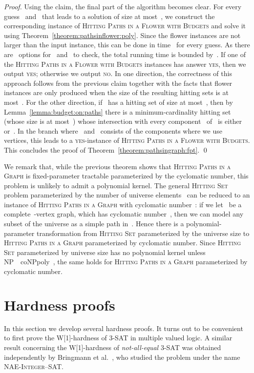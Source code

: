 \let\accentvec\vec  \documentclass{llncs}
\newcommand{\yes}{\textsc{yes}\xspace}
\newcommand{\no}{\textsc{no}\xspace}
\newcommand{\containment}[0]{{\sf NP}~~{\sf coNPpoly}\xspace}
\newcommand{\HitPathsInFlower}{\textsc{Hitting Paths in a Flower with Budgets}\xspace}
\newcommand{\HitPathsInGraph}{\textsc{Hitting Paths in a Graph}\xspace}
\newcommand{\HittingSet}{\textsc{Hitting Set}\xspace}
\begin{document}
\begin{proof}
Using the claim, the final part of the algorithm becomes clear. For every guess~ and~ that leads to a solution of size at most~, we construct the corresponding instance of \HitPathsInFlower and solve it using Theorem~\ref{theorem:pathsinflower:poly}. Since the flower instances are not larger than the input instance, this can be done in time~ for every guess. As there are~ options for~ and~ to check, the total running time is bounded by~. If one of the \HitPathsInFlower instances has answer \yes, then we output \yes; otherwise we output \no. In one direction, the correctness of this approach follows from the previous claim together with the facts that flower instances are only produced when the size of the resulting hitting sets is at most~. For the other direction, if~ has a hitting set of size at most~, then by Lemma~\ref{lemma:budget:on:paths} there is a minimum-cardinality hitting set~ (whose size is at most~) whose intersection with every component~ of~ is either~ or~. In the branch where~ and~ consists of the components where we use~ vertices, this leads to a \yes-instance of \HitPathsInFlower. This concludes the proof of Theorem~\ref{theorem:pathsingraph:fpt}.
\qed
\end{proof}

We remark that, while the previous theorem shows that \HitPathsInGraph is fixed-parameter tractable parameterized by the cyclomatic number, this problem is unlikely to admit a polynomial kernel. The general \HittingSet problem parameterized by the number of universe elements~ can be reduced to an instance of \HitPathsInGraph with cyclomatic number~: if we let~ be a complete~-vertex graph, which has cyclomatic number~, then we can model any subset of the universe as a simple path in~. Hence there is a polynomial-parameter transformation from \HittingSet parameterized by the universe size to \HitPathsInGraph parameterized by cyclomatic number. Since \HittingSet parameterized by universe size has no polynomial kernel unless \containment~\cite[Theorem 5.3]{DomLS14}, the same holds for \HitPathsInGraph parameterized by cyclomatic number.

\section{Hardness proofs} \label{section:hardness}

In this section we develop several hardness proofs. It turns out to be convenient to first prove the W[1]-hardness of 3-SAT in multiple valued logic. A similar result concerning the W[1]-hardness of \emph{not-all-equal} 3-SAT was obtained independently by Bringmann et al.~\cite{BringmannHML15}, who studied the problem under the name \textsc{NAE-Integer--SAT}.
\end{document}
